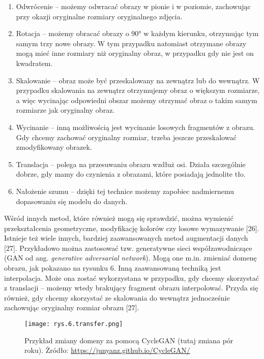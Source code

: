 \begin{enumerate}
	\item Odwrócenie – możemy odwracać obrazy w pionie i w poziomie, zachowując przy okazji oryginalne rozmiary oryginalnego zdjęcia.

	\item Rotacja – możemy obracać obrazy o 90° w każdym kierunku, otrzymując tym samym trzy nowe obrazy. W tym przypadku natomiast otrzymane obrazy mogą mieć inne rozmiary niż oryginalny obraz, w przypadku gdy nie jest on kwadratem.

	\item Skalowanie – obraz może być przeskalowany na zewnątrz lub do wewnątrz. W przypadku skalowania na zewnątrz otrzymujemy obraz o większym rozmiarze, a więc wycinając odpowiedni obszar możemy otrzymać obraz o takim samym rozmiarze jak oryginalny obraz.

	\item Wycinanie – inną możliwością jest wycinanie losowych fragmentów z obrazu. Gdy chcemy zachować oryginalny rozmiar, trzeba jeszcze przeskalować zmodyfikowany obrazek.

	\item Translacja – polega na przesuwaniu obrazu wzdłuż osi. Działa szczególnie dobrze, gdy mamy do czynienia z obrazami, które posiadają jednolite tło.

	\item Nałożenie szumu – dzięki tej technice możemy zapobiec nadmiernemu dopasowaniu się modelu do danych. 
\end{enumerate}
Wśród innych metod, które również mogą się sprawdzić, można wymienić przekształcenia geometryczne, modyfikację kolorów czy losowe wymazywanie [26]. Istnieje też wiele innych, bardziej zaawansowanych metod augmentacji danych [27]. Przykładowo można zastosować tzw. generatywne sieci współzawodniczące (GAN od ang. \textit{generative adversarial network}). Mogą one m.in. zmieniać domenę obrazu, jak pokazano na rysunku 6. Inną zaawansowaną techniką jest interpolacja. Może ona zostać wykorzystana w przypadku, gdy chcemy skorzystać z translacji – możemy wtedy brakujący fragment obrazu interpolować. Przyda się również, gdy chcemy skorzystać ze skalowania do wewnątrz jednocześnie zachowując oryginalny rozmiar obrazu [27]. 

\begin{figure}[h]
    \centering
    \texttt{[image: rys.6.transfer.png]}
    \caption{Przykład zmiany domeny za pomocą CycleGAN (tutaj zmiana pór roku). \protect\linebreak Żródło: \protect\url{https://junyanz.github.io/CycleGAN/}}
    \label{fig:mesh6}
\end{figure}

